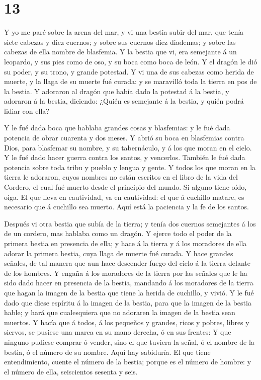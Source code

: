 \hypertarget{section-66-13}{%
\section{13}\label{section-66-13}}

 Y yo me paré sobre la arena del mar, y vi una bestia
subir del mar, que tenía siete cabezas y diez cuernos; y sobre sus
cuernos diez diademas; y sobre las cabezas de ella nombre de blasfemia.
 Y la bestia que vi, era semejante á un leopardo, y sus
pies como de oso, y su boca como boca de león. Y el dragón le dió su
poder, y su trono, y grande potestad.  Y vi una de sus
cabezas como herida de muerte, y la llaga de su muerte fué curada: y se
maravilló toda la tierra en pos de la bestia.  Y adoraron
al dragón que había dado la potestad á la bestia, y adoraron á la
bestia, diciendo: ¿Quién es semejante á la bestia, y quién podrá lidiar
con ella?

 Y le fué dada boca que hablaba grandes cosas y
blasfemias: y le fué dada potencia de obrar cuarenta y dos meses.
 Y abrió su boca en blasfemias contra Dios, para blasfemar
su nombre, y su tabernáculo, y á los que moran en el cielo.
 Y le fué dado hacer guerra contra los santos, y
vencerlos. También le fué dada potencia sobre toda tribu y pueblo y
lengua y gente.  Y todos los que moran en la tierra le
adoraron, cuyos nombres no están escritos en el libro de la vida del
Cordero, el cual fué muerto desde el principio del mundo. 
Si alguno tiene oído, oiga.  El que lleva en cautividad,
va en cautividad: el que á cuchillo matare, es necesario que á cuchillo
sea muerto. Aquí está la paciencia y la fe de los santos.

 Después vi otra bestia que subía de la tierra; y tenía
dos cuernos semejantes á los de un cordero, mas hablaba como un dragón.
 Y ejerce todo el poder de la primera bestia en presencia
de ella; y hace á la tierra y á los moradores de ella adorar la primera
bestia, cuya llaga de muerte fué curada.  Y hace grandes
señales, de tal manera que aun hace descender fuego del cielo á la
tierra delante de los hombres.  Y engaña á los moradores
de la tierra por las señales que le ha sido dado hacer en presencia de
la bestia, mandando á los moradores de la tierra que hagan la imagen de
la bestia que tiene la herida de cuchillo, y vivió.  Y le
fué dado que diese espíritu á la imagen de la bestia, para que la imagen
de la bestia hable; y hará que cualesquiera que no adoraren la imagen de
la bestia sean muertos.  Y hacía que á todos, á los
pequeños y grandes, ricos y pobres, libres y siervos, se pusiese una
marca en su mano derecha, ó en sus frentes:  Y que
ninguno pudiese comprar ó vender, sino el que tuviera la señal, ó el
nombre de la bestia, ó el número de su nombre.  Aquí hay
sabiduría. El que tiene entendimiento, cuente el número de la bestia;
porque es el número de hombre: y el número de ella, seiscientos sesenta
y seis.

